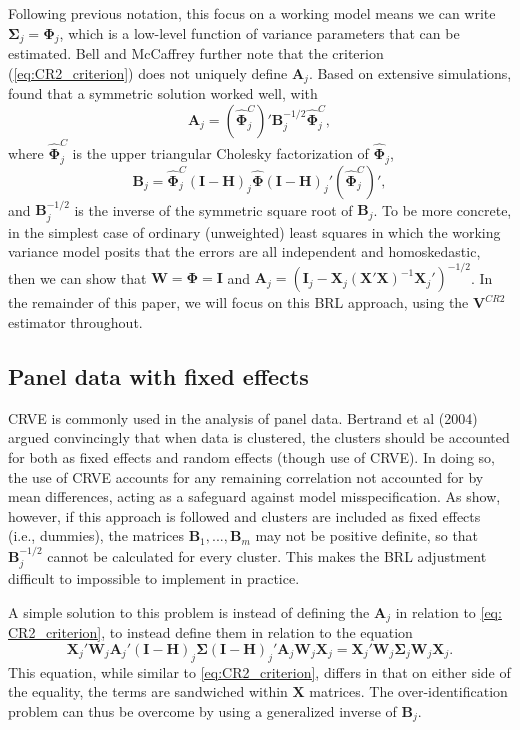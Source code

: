 \documentclass[12pt]{article}
\newcommand{\bm}{\mathbf}
\newcommand{\bs}{\boldsymbol}
\begin{document}
Following previous notation, this focus on a working model means we can write $\bs{\Sigma}_j = \bs{\Phi}_j$, which is a low-level function of variance parameters that can be estimated. Bell and McCaffrey further note that the criterion (\ref{eq:CR2_criterion}) does not uniquely define $\bm{A}_j$. Based on extensive simulations, \citet{McCaffrey2001generalizations} found that a symmetric solution worked well, with 
\begin{equation}
\label{eq:CR2_adjustment}
\bm{A}_j = \left(\hat{\bs\Phi}_j^C\right)' \bm{B}_j^{-1/2}\hat{\bs\Phi}_j^C,
\end{equation}
where $\hat{\bs\Phi}_j^C$ is the upper triangular Cholesky factorization of $\hat{\bs\Phi}_j$, 
\begin{equation}
\label{eq:CR2_Bmatrix}
\bm{B}_j = \hat{\bs\Phi}_j^C\left(\bm{I} - \bm{H}\right)_j \hat{\bs\Phi} \left(\bm{I} - \bm{H}\right)_j' \left(\hat{\bs\Phi}_j^C\right)',
\end{equation}
and $\bm{B}_j^{-1/2}$ is the inverse of the symmetric square root of $\bm{B}_j $. To be more concrete, in the simplest case of ordinary (unweighted) least squares in which the working variance model posits that the errors are all independent and homoskedastic, then we can show that $\bm{W} = \bs\Phi = \bm{I}$ and $\bm{A}_j = \left(\bm{I}_j - \bm{X}_j\left(\bm{X}'\bm{X}\right)^{-1}\bm{X}_j'\right)^{-1/2}$. In the remainder of this paper, we will focus on this BRL approach, using the $\bm{V}^{CR2}$ estimator throughout. 


\subsection{Panel data with fixed effects}
CRVE is commonly used in the analysis of panel data. Bertrand et al (2004) argued convincingly that when data is clustered, the clusters should be accounted for both as fixed effects and random effects (though use of CRVE). 
In doing so, the use of CRVE accounts for any remaining correlation not accounted for by mean differences, acting as a safeguard against model misspecification.
As \citet{Angrist2009mostly} show, however, if this approach is followed and clusters are included as fixed effects (i.e., dummies), the matrices $\bm{B}_1,...,\bm{B}_m$ may not be positive definite, so that $\bm{B}_j^{-1/2}$ cannot be calculated for every cluster.
This makes the BRL adjustment difficult to impossible to implement in practice.

A simple solution to this problem is instead of defining the $\bm{A}_j$ in relation to \ref{eq: CR2_criterion}, to instead define them in relation to the equation
\begin{equation}
\label{eq:CR2_criterion_new}
\bm{X}_j' \bm{W}_j \bm{A}_j' \left(\bm{I} - \bm{H}\right)_j \bs{\Sigma} \left(\bm{I} - \bm{H}\right)_j' \bm{A}_j \bm{W}_j \bm{X}_j = \bm{X}_j' \bm{W}_j \bs{\Sigma}_j \bm{W}_j \bm{X}_j.
\end{equation}
This equation, while similar to \ref{eq:CR2_criterion}, differs in that on either side of the equality, the terms are sandwiched within $\bm{X}$ matrices. The over-identification problem can thus be overcome by using a generalized inverse of $\bm{B}_j$. 
\end{document}
